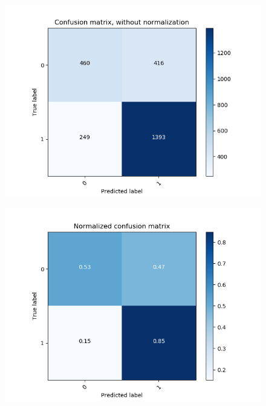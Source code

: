 \begin{figure}
\begin{minipage}[b]{0.45\columnwidth}
	\centering
	\includegraphics[clip, width=\linewidth]{fig/chapter4/count_pretrain_False_he_True}
	\label{fig: count_he_preprocess}
    \end{minipage}
	\begin{minipage}[b]{0.45\columnwidth}
		\centering
		\includegraphics[clip, width=\linewidth]{fig/chapter4/pretrain_False_he_True}
		\label{fig: he_preprocess}
	\end{minipage}
	\begin{minipage}[b]{0.45\columnwidth}
	\centering

\end{minipage}
\end{figure}
